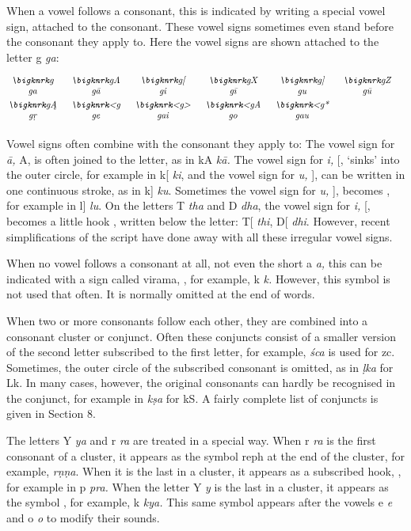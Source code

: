 \documentclass[12pt]{article}
\begin{document}
When a vowel follows a consonant, this is indicated by writing a special vowel sign,
attached to the consonant. These vowel signs sometimes even stand before the
consonant they apply to. Here the vowel signs are shown attached to the letter 
{\knrk g} {\it ga\/}:

$$
\vbox{\halign{\it\hfill#\hfill\quad&&\it\hfill#\hfill\quad\cr
\OB{g}{ga}	&\OB{gA}{g\=a}	&\OB{g[}{gi}	&\OB{gX}{g\=\i} &\OB{g]}{gu}	&\OB{gZ}{g\=u}	\cr\noalign{\smallskip}
\OB{g\odsignri}{g\d r}	&\OB{<g}{ge}	&\OB{<g>}{gai}	&\OB{<gA}{go} &\OB{<g*}{gau}	\cr\noalign{\smallskip}
}}
$$

Vowel signs often combine with the consonant they apply to:
The vowel sign for {\it\=a,} {\knrk\dotcircle A}, is often joined to the letter, as
in {\knrk kA} {\it k\=a.}
The vowel sign for {\it i,} {\knrk\dotcircle[}, `sinks' into the outer circle,
for example in 
{\knrk k[} {\it ki}, and the vowel sign for {\it u,} {\knrk\dotcircle]}, can be written
in one continuous stroke, as in {\knrk k]} {\it ku}. Sometimes
the vowel sign for {\it u,} {\knrk\dotcircle]}, becomes {\knrk\dotcircle\odsignuvar},
for example in {\knrk l]} {\it lu}.
On the letters  
{\knrk T} {\it tha\/} and {\knrk D} {\it dha}, the vowel sign for {\it i,}
{\knrk\dotcircle[}, becomes a little hook {\knrk\dotcircle\odsignivar}, written
below the letter: {\knrk T[} {\it thi}, {\knrk D[} {\it dhi}. However, recent
simplifications
of the script have done away with all these irregular vowel signs.

When no vowel follows a consonant at all, not even the short {\knrk a} {\it a,}
this can be indicated with
a sign called virama, {\knrk\dotcircle\odhalant}, for example, {\knrk k\odhalant} {\it k.}
However, this symbol is not
used that often. It is normally omitted at the end of words.

When two or more consonants follow each other, they are combined into a
consonant cluster or conjunct.
Often these conjuncts consist of a smaller version of the second letter subscribed
to the first letter, for example, {\knrk\odshca} {\it \'sca\/}
is used for {\knrk z\odhalant c}. Sometimes,
the outer circle of the subscribed consonant is omitted, as in {\knrk \odLka} {\it \d{l}ka\/}
for {\knrk L\odhalant k}. In many cases, however, the original consonants can hardly
be recognised in the conjunct, for example in {\knrk\odkSa} {\it k\d sa\/}
for {\knrk k\odhalant S}. A fairly complete list of conjuncts is given in Section 8.

The letters {\knrk Y} {\it ya} and {\knrk r} {\it ra\/} are treated in a special way. 
When {\knrk r} {\it ra\/} is the first consonant of a cluster, it appears as the symbol
reph {\knrk\dotcircle\odreph} at
the end of the cluster, for example, {\knrk\odNNa\odreph} {\it r\d n\d na}. When it
is the last in a cluster, it appears as a subscribed hook, {\knrk\dotcircle\odsecra}, for
example in {\knrk p\odsecra} {\it pra.} When the letter {\knrk Y} {\it y\/} is the
last in a cluster,
it appears as the symbol {\knrk\dotcircle\odsecya}, for example, {\knrk k\odsecya} {\it
kya.} This same symbol {\knrk\dotcircle\odsecya} appears after the vowels {\knrk e} 
{\it e\/} and {\knrk o} {\it o\/} to modify their sounds.
\end{document}
